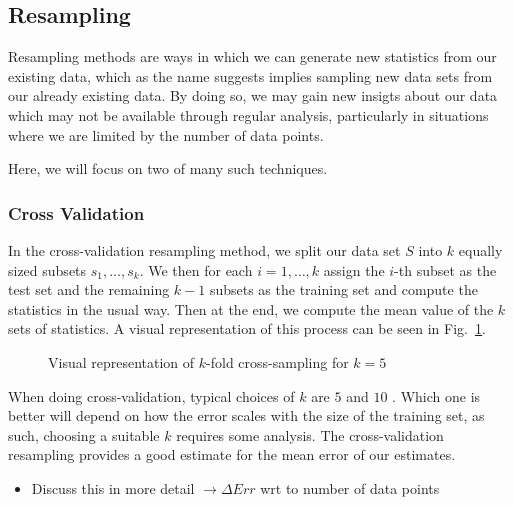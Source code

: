 \documentclass[reprint, english, nofootinbib]{revtex4-2}
\begin{document}
    \subsection{Resampling}
        \noindent
        Resampling methods are ways in which we can generate new statistics from our existing data, which as the name suggests implies sampling new data sets from our already existing data. By doing so, we may gain new insigts about our data which may not be available through regular analysis, particularly in situations where we are limited by the number of data points.

        Here, we will focus on two of many such techniques.

        \subsubsection{Cross Validation}
            \noindent
            In the cross-validation resampling method, we split our data set $S$ into $k$ equally sized subsets $s_1, \dots, s_k$.
            We then for each $i = 1,\dots, k$ assign the $i$-th subset as the test set and the remaining $k-1$ subsets as the training set and compute the statistics in the usual way. Then at the end, we compute the mean value of the $k$ sets of statistics. A visual representation of this process can be seen in Fig.~\ref{fig: Cross Validation}.
            \begin{figure}[h!tb]
                \center
                
                \caption{\label{fig: Cross Validation}Visual representation of $k$-fold cross-sampling for $k=5$}
            \end{figure}
            When doing cross-validation, typical choices of $k$ are $5$ and $10$ \cite{hastie}. Which one is better will depend on how the error scales with the size of the training set, as such, choosing a suitable $k$ requires some analysis.
            The cross-validation resampling provides a good estimate for the mean error of our estimates.
            \begin{itemize}
                \item Discuss this in more detail $\rightarrow\Delta Err$ wrt to number of data points
            \end{itemize}
\end{document}
